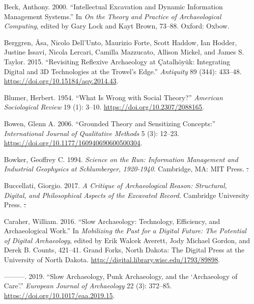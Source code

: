 \documentclass[
]{article}
\makeatletter
\newlength{\cslhangindent}
\newenvironment{CSLReferences}[2] %
 {\begin{list}{}{%
  \setlength{\itemindent}{0pt}
  \setlength{\leftmargin}{0pt}
  \setlength{\parsep}{0pt}
  \ifodd #1
   \setlength{\leftmargin}{\cslhangindent}
   \setlength{\itemindent}{-1\cslhangindent}
  \fi
  \setlength{\itemsep}{#2\baselineskip}}}
 {\end{list}}
\providecommand{\DIFdel}[1]{{\protect\color{red}\sout{#1}}} %
\providecommand{\DIFaddbegin}{} %
\providecommand{\DIFaddend}{} %
\providecommand{\DIFdelbegin}{} %
\providecommand{\DIFdelend}{} %
\newcommand{\DIFscaledelfig}{0.5}
\newlength{\DIFdelgraphicswidth} %
\newlength{\DIFdelgraphicsheight} %
\newcommand{\DIFaddincludegraphics}[2][]{{\color{blue}\fbox{\DIFOincludegraphics[#1]{#2}}}} %
\newcommand{\DIFdelincludegraphics}[2][]{%
\sbox{\DIFdelgraphicsbox}{\DIFOincludegraphics[#1]{#2}}%
\settoboxwidth{\DIFdelgraphicswidth}{\DIFdelgraphicsbox} %
\settoboxtotalheight{\DIFdelgraphicsheight}{\DIFdelgraphicsbox} %
\scalebox{\DIFscaledelfig}{%
\parbox[b]{\DIFdelgraphicswidth}{\usebox{\DIFdelgraphicsbox}\\[-\baselineskip] \rule{\DIFdelgraphicswidth}{0em}}\llap{\resizebox{\DIFdelgraphicswidth}{\DIFdelgraphicsheight}{%
\setlength{\unitlength}{\DIFdelgraphicswidth}%
\begin{picture}(1,1)%
\thicklines\linethickness{2pt} %
{\color[rgb]{1,0,0}\put(0,0){\framebox(1,1){}}}%
{\color[rgb]{1,0,0}\put(0,0){\line( 1,1){1}}}%
{\color[rgb]{1,0,0}\put(0,1){\line(1,-1){1}}}%
\end{picture}%
}\hspace*{3pt}}} %
} %
\DeclareRobustCommand{\DIFaddbegin}{\DIFOaddbegin \let\includegraphics\DIFaddincludegraphics} %
\DeclareRobustCommand{\DIFaddend}{\DIFOaddend \let\includegraphics\DIFOincludegraphics} %
\DeclareRobustCommand{\DIFdelbegin}{\DIFOdelbegin \let\includegraphics\DIFdelincludegraphics} %
\DeclareRobustCommand{\DIFdelend}{\DIFOaddend \let\includegraphics\DIFOincludegraphics} %
\let\sout@orig\sout %
\renewcommand{\sout}[1]{\ifmmode\text{\sout@orig{\ensuremath{#1}}}\else\sout@orig{#1}\fi} %
\makeatother
\begin{document}
\begin{CSLReferences}{1}{0}
Beck, Anthony. 2000. {``Intellectual Excavation and Dynamic Information
Management Systems.''} In \emph{On the {Theory} and {Practice} of
{Archaeological Computing}}, edited by Gary Lock and Kayt Brown, 73--88.
Oxford: Oxbow.

Berggren, Åsa, Nicolo Dell'Unto, Maurizio Forte, Scott Haddow, Ian
Hodder, Justine Issavi, Nicola Lercari, Camilla Mazzucato, Allison
Mickel, and James S. Taylor. 2015. {``Revisiting Reflexive Archaeology
at {Çatalhöyük}: {Integrating} Digital and {3D} Technologies at the
Trowel's Edge.''} \emph{Antiquity} 89 (344): 433--48.
\url{https://doi.org/10.15184/aqy.2014.43}.

Blumer, Herbert. 1954. {``What Is Wrong with Social Theory?''}
\emph{American Sociological Review} 19 (1): 3--10.
\url{https://doi.org/10.2307/2088165}.

Bowen, Glenn A. 2006. {``Grounded {Theory} and {Sensitizing
Concepts}:''} \emph{International Journal of Qualitative Methods} 5 (3):
12--23. \url{https://doi.org/10.1177/160940690600500304}.

Bowker, Geoffrey C. 1994. \emph{Science on the {Run}: {Information
Management} and {Industrial Geophysics} at {Schlumberger}, 1920-1940}.
Cambridge, MA: MIT Press.
\DIFdelbegin %
\DIFdel{.
}\DIFdelend 

Buccellati, Giorgio. 2017. \emph{A {Critique} of {Archaeological
Reason}: {Structural}, {Digital}, and {Philosophical Aspects} of the
{Excavated Record}}. Cambridge University Press.
\DIFdelbegin %
\DIFdel{.
}\DIFdelend 

Caraher, William. 2016. {``Slow {Archaeology}: {Technology},
{Efficiency}, and {Archaeological Work}.''} In \emph{Mobilizing the
{Past} for a {Digital Future}: {The Potential} of {Digital
Archaeology}}, edited by Erik Walcek Averett, Jody Michael Gordon, and
Derek B. Counts, 421--41. Grand Forks, North Dakota: The Digital Press
at the University of North Dakota.
\DIFdelbegin %
\DIFdelend \DIFaddbegin \url{http://digital.library.wisc.edu/1793/89898}\DIFaddend .

---------. 2019. {``Slow {Archaeology}, {Punk Archaeology}, and the
{`{Archaeology} of {Care}'}.''} \emph{European Journal of Archaeology}
22 (3): 372--85. \url{https://doi.org/10.1017/eaa.2019.15}.


\end{CSLReferences}
\end{document}
